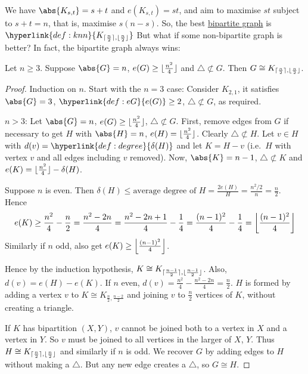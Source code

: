 \documentclass{article}
\DeclarePairedDelimiter\ceil{\lceil}{\rceil}
\DeclarePairedDelimiter\floor{\lfloor}{\rfloor}
\begin{document}
We have $\abs{K_{s, t}} = s + t$ and $e(K_{s, t}) = st$, and aim to maximise $st$ subject to $s + t = n$, that is, maximise $s(n-s)$.
So, the best \hyperlink{def:bipartite}{bipartite graph} is $\hyperlink{def:knn}{K_{\ceil{\frac{n}{2}}, \floor{\frac{n}{2}}}}$
But what if some non-bipartite graph is better?
In fact, the bipartite graph always wins:

\begin{nthm}\label{thm:8}
    Let $n \geq 3$. Suppose $\abs{G} = n$, $e(G) \geq \floor{\frac{n^2}{4}}$ and $\triangle \not\subset G$.
    Then $G \cong K_{\ceil{\frac{n}{2}}, \floor{\frac{n}{2}}}$.
\end{nthm}

\begin{proof}
    Induction on $n$. Start with the $n=3$ case: Consider $K_{2, 1}$, it satisfies $\abs{G} = 3$, $\hyperlink{def:eG}{e(G)} \geq 2$, $\triangle \not\subset G$, as required.

    $n>3$: Let $\abs{G} = n$, $e(G) \geq \floor{\frac{n^2}{4}}$, $\triangle \not\subset G$.
    First, remove edges from $G$ if necessary to get $H$ with $\abs{H} = n$, $e(H) = \floor{\frac{n^2}{4}}$. Clearly $\triangle \not\subset H$.
    Let $v \in H$ with $d(v) = \hyperlink{def:degree}{\delta(H)}$ and let $K = H - v$ (i.e.\ $H$ with vertex $v$ and all edges including $v$ removed).
    Now, $\abs{K} = n-1$, $\triangle \not\subset K$ and $e(K) = \floor{\frac{n^2}{4}} - \delta(H)$.

    Suppose $n$ is even. Then $\delta(H) \leq \text{average degree of } H = \frac{2 e(H)}{H} = \frac{n^2/2}{n} = \frac{n}{2}$.
    Hence
    \begin{equation*}
    e(K) \geq \frac{n^2}{4} - \frac{n}{2} = \frac{n^2 - 2n}{4} = \frac{n^2 - 2n + 1}{4} - \frac{1}{4} = \frac{(n-1)^2}{4} - \frac{1}{4} = \floor*{\frac{(n-1)^2}{4}}\end{equation*}
    Similarly if $n$ odd, also get $e(K) \geq \floor*{\frac{(n-1)^2}{4}}$.

    Hence by the induction hypothesis, $K \cong K_{\ceil{\frac{n-1}{2}}, \floor{\frac{n-1}{2}}}$.
    Also, $d(v) = e(H) - e(K)$.
    If $n$ even, $d(v) = \frac{n^2}{4} - \frac{n^2 - 2n}{4} = \frac{n}{2}$.
    $H$ is formed by adding a vertex $v$ to $K \cong K_{\frac{n}{2}, \frac{n-2}{2}}$ and joining $v$ to $\frac{n}{2}$ vertices of $K$, without creating a triangle.

    If $K$ has bipartition $(X, Y)$, $v$ cannot be joined both to a vertex in $X$ and a vertex in $Y$. So $v$ must be joined to all vertices in the larger of $X$, $Y$.
    Thus $H \cong K_{\ceil{\frac{n}{2}}, \floor{\frac{n}{2}}}$ and similarly if $n$ is odd.
    We recover $G$ by adding edges to $H$ without making a $\triangle$. But any new edge creates a $\triangle$, so $G \cong H$.
\end{proof}
\end{document}
